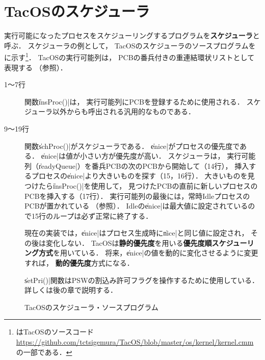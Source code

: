 \section{TacOSのスケジューラ}
実行可能になったプロセスをスケジューリングするプログラムを{\bf スケジューラ}と呼ぶ．
スケジューラの例として，
TacOSのスケジューラのソースプログラムをに示す\footnote{
はTacOSのソースコード
\url{https://github.com/tctsigemura/TacOS/blob/master/os/kernel/kernel.cmm}
の一部である．}．
TacOSの実行可能列は，
PCBの番兵付きの重連結環状リストとして表現する
（参照）．

\begin{description}
\item[1〜7行] 関数\|insProc()|は，
実行可能列にPCBを登録するために使用される．
スケジューラ以外からも呼出される汎用的なものである．

\item[9〜19行] 関数\|schProc()|がスケジューラである．
\|enice|がプロセスの優先度である．
\|enice|は値が小さい方が優先度が高い．
スケジューラは，
実行可能列（\|readyQueue|）を番兵PCBの次のPCBから開始して（14行），
挿入するプロセスの\|enice|より大きいものを探す（15，16行）．
大きいものを見つけたら\|insProc()|を使用して，
見つけたPCBの直前に新しいプロセスのPCBを挿入する（17行）．
実行可能列の最後には，常時IdleプロセスのPCBが置かれている
（参照）．
Idleの\|enice|は最大値に設定されているので15行のループは必ず正常に終了する．

現在の実装では，\|enice|はプロセス生成時に\|nice|と同じ値に設定され，
その後は変化しない．
TacOSは{\bf 静的優先度}を用いる{\bf 優先度順スケジューリング方式}を用いている．
将来，\|enice|の値を動的に変化させるように変更すれば，
{\bf 動的優先度}方式になる．

\|setPri()|関数はPSWの割込み許可フラグを操作するために使用している．
詳しくは後の章で説明する．
\end{description}

\begin{figure}[btp]

\caption{TacOSのスケジューラ・ソースプログラム}
\label{fig:tacosSch}
\end{figure}
